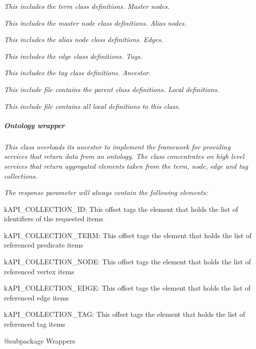 {\itshape This includes the term class definitions. Master nodes.}

{\itshape This includes the master node class definitions. Alias nodes.}

{\itshape This includes the alias node class definitions. Edges.}

{\itshape This includes the edge class definitions. Tags.}

{\itshape This includes the tag class definitions. Ancestor.}

{\itshape This include file contains the parent class definitions. Local definitions.}

{\itshape This include file contains all local definitions to this class. \subparagraph*{Ontology wrapper}}

{\itshape }

{\itshape This class overloads its ancestor to implement the framework for providing services that return data from an ontology. The class concentrates on high level services that return aggregated elements taken from the term, node, edge and tag collections.}

{\itshape The response parameter will always contain the following elements\-:}

{\itshape 
\begin{DoxyItemize}
\item {\ttfamily k\-A\-P\-I\-\_\-\-C\-O\-L\-L\-E\-C\-T\-I\-O\-N\-\_\-\-I\-D}\-: This offset tags the element that holds the list of identifiers of the requested items. 
\item {\ttfamily k\-A\-P\-I\-\_\-\-C\-O\-L\-L\-E\-C\-T\-I\-O\-N\-\_\-\-T\-E\-R\-M}\-: This offset tags the element that holds the list of referenced predicate items 
\item {\ttfamily k\-A\-P\-I\-\_\-\-C\-O\-L\-L\-E\-C\-T\-I\-O\-N\-\_\-\-N\-O\-D\-E}\-: This offset tags the element that holds the list of referenced vertex items 
\item {\ttfamily k\-A\-P\-I\-\_\-\-C\-O\-L\-L\-E\-C\-T\-I\-O\-N\-\_\-\-E\-D\-G\-E}\-: This offset tags the element that holds the list of referenced edge items 
\item {\ttfamily k\-A\-P\-I\-\_\-\-C\-O\-L\-L\-E\-C\-T\-I\-O\-N\-\_\-\-T\-A\-G}\-: This offset tags the element that holds the list of referenced tag items 
\end{DoxyItemize}}

{\itshape \begin{DoxyVerb} @subpackage        Wrappers\end{DoxyVerb}
}

